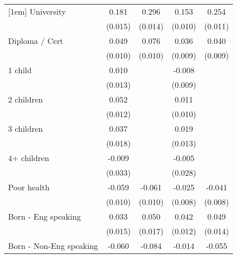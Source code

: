 {\begin{tabular}{l*{4}{c}}
[1em]
University          &       0.181\sym{***}&       0.296\sym{***}&       0.153\sym{***}&       0.254\sym{***}\\
                    &     (0.015)         &     (0.014)         &     (0.010)         &     (0.011)         \\
[1em]
Diploma / Cert      &       0.049\sym{***}&       0.076\sym{***}&       0.036\sym{***}&       0.040\sym{***}\\
                    &     (0.010)         &     (0.010)         &     (0.009)         &     (0.009)         \\
[1em]
1 child             &       0.010         &                     &      -0.008         &                     \\
                    &     (0.013)         &                     &     (0.009)         &                     \\
[1em]
2 children          &       0.052\sym{***}&                     &       0.011         &                     \\
                    &     (0.012)         &                     &     (0.010)         &                     \\
[1em]
3 children          &       0.037\sym{*}  &                     &       0.019         &                     \\
                    &     (0.018)         &                     &     (0.013)         &                     \\
[1em]
4+ children         &      -0.009         &                     &      -0.005         &                     \\
                    &     (0.033)         &                     &     (0.028)         &                     \\
[1em]
Poor health         &      -0.059\sym{***}&      -0.061\sym{***}&      -0.025\sym{**} &      -0.041\sym{***}\\
                    &     (0.010)         &     (0.010)         &     (0.008)         &     (0.008)         \\
[1em]
Born - Eng speaking &       0.033\sym{*}  &       0.050\sym{**} &       0.042\sym{***}&       0.049\sym{***}\\
                    &     (0.015)         &     (0.017)         &     (0.012)         &     (0.014)         \\
[1em]
Born - Non-Eng speaking&      -0.060\sym{***}&      -0.084\sym{***}&      -0.014         &      -0.055\sym{***}\\

\end{tabular}}
